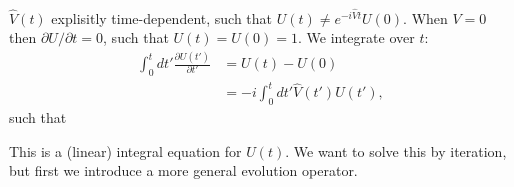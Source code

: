 $\hat{V}(t)$ explisitly time-dependent, such that $U(t)\neq e^{-i\hat{V}t}U(0)$. \newline
\newline
When $V=0$ then $\partial U/\partial t=0$, such that $U(t)=U(0)=1$.\newline
\newline
We integrate over $t$:
\begin{align}
	\int_{0}^{t}dt'\frac{\partial U(t')}{\partial t'}&=U(t)-U(0)\nonumber \\ 
	&= -i\int_{0}^{t}dt'\hat{V}(t')U(t'),
\end{align}
such that \newline
\begin{center}
			\end{center}
\vspace{5pt}
This is a (linear) integral equation for $U(t)$. We want to solve this by iteration, but first we introduce a more general evolution operator.
